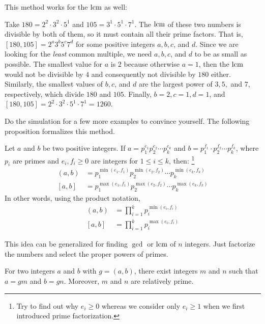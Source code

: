 \documentclass{subfile}
\begin{document}
	This method works for the $\operatorname{lcm}$ as well:
	\begin{example}
		Take $180=2^2\cdot3^2\cdot5^1$ and $105=3^1\cdot5^1\cdot7^1$. The $\operatorname{lcm}$ of these two numbers is divisible by both of them, so it must contain all their prime factors. That is, $[180, 105]=2^a3^b5^c7^d$ for some positive integers $a,b,c$, and $d$. Since we are looking for the \textit{least} common multiple, we need $a,b,c$, and $d$ to be as small as possible. The smallest value for $a$ is $2$ because otherwise $a=1$, then the $\operatorname{lcm}$ would not be divisible by $4$ and consequently not divisible by $180$ either. Similarly, the smallest values of $b,c$, and $d$ are the largest power of $3, 5,$ and $7$, respectively, which divide $180$ and $105$. Finally, $b=2, c=1, d=1$, and $[180, 105] = 2^2\cdot3^2\cdot5^1 \cdot 7^1 = 1260$.
	\end{example}
	Do the simulation for a few more examples to convince yourself. The following proposition formalizes this method.

	\begin{proposition}\label{prop:gcdfactorization}
		Let $a$ and $b$ be two positive integers. If $a=p_1^{e_1}p_2^{e_2}\cdots p_k^{e_k}$ and $b=p_1^{f_1}\cdot p_2^{f_2}\cdots p_k^{f_k}$, where $p_i$ are primes and $e_i,f_i\geq0$ are integers for $1\leq i\leq k$, then: \footnote{Try to find out why $e_i\geq0$ whereas we consider only $e_i\geq1$ when we first introduced prime factorization.}
		\begin{align*}
			(a,b) & =p_1^{\min(e_1,f_1)}p_2^{\min(e_2,f_2)}\cdots p_k^{\min(e_k,f_k)}\\
			[a,b] &= p_1^{\max(e_1,f_1)}p_2^{ \max (e_2,f_2)}\cdots p_k^{\max(e_k,f_k)}
		\end{align*}
		In other words, using  the product notation,
		\begin{align*}
			(a,b) & =\prod_{i=1}^kp_i^{\min(e_i,f_i)}\\
			[a,b] & =\prod_{i=1}^kp_i^{\max(e_i,f_i)}
		\end{align*}
	\end{proposition}

	\begin{note}
		This idea can be generalized for finding $\gcd$ or $\operatorname{lcm}$ of $n$ integers. Just factorize the numbers and select the proper powers of primes.
	\end{note}
	\begin{proposition}\label{prop:gcduncommon}
		For two integers $a$ and $b$ with $g=(a,b)$, there exist integers $m$ and $n$ such that $a=gm$ and $b=gn$. Moreover, $m$ and $n$ are relatively prime.
	\end{proposition}
\end{document}
